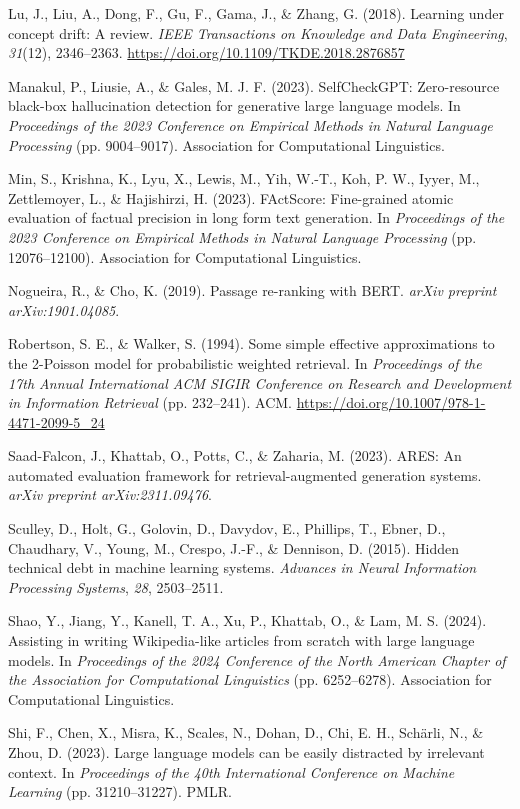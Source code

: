 {Lu, J., Liu, A., Dong, F., Gu, F., Gama, J., \& Zhang, G. (2018). Learning under concept drift: A review. \textit{IEEE Transactions on Knowledge and Data Engineering}, \textit{31}(12), 2346--2363. \url{https://doi.org/10.1109/TKDE.2018.2876857}

Manakul, P., Liusie, A., \& Gales, M. J. F. (2023). SelfCheckGPT: Zero-resource black-box hallucination detection for generative large language models. In \textit{Proceedings of the 2023 Conference on Empirical Methods in Natural Language Processing} (pp. 9004--9017). Association for Computational Linguistics.

Min, S., Krishna, K., Lyu, X., Lewis, M., Yih, W.-T., Koh, P. W., Iyyer, M., Zettlemoyer, L., \& Hajishirzi, H. (2023). FActScore: Fine-grained atomic evaluation of factual precision in long form text generation. In \textit{Proceedings of the 2023 Conference on Empirical Methods in Natural Language Processing} (pp. 12076--12100). Association for Computational Linguistics.

Nogueira, R., \& Cho, K. (2019). Passage re-ranking with BERT. \textit{arXiv preprint arXiv:1901.04085}.

Robertson, S. E., \& Walker, S. (1994). Some simple effective approximations to the 2-Poisson model for probabilistic weighted retrieval. In \textit{Proceedings of the 17th Annual International ACM SIGIR Conference on Research and Development in Information Retrieval} (pp. 232--241). ACM. \url{https://doi.org/10.1007/978-1-4471-2099-5_24}

Saad-Falcon, J., Khattab, O., Potts, C., \& Zaharia, M. (2023). ARES: An automated evaluation framework for retrieval-augmented generation systems. \textit{arXiv preprint arXiv:2311.09476}.

Sculley, D., Holt, G., Golovin, D., Davydov, E., Phillips, T., Ebner, D., Chaudhary, V., Young, M., Crespo, J.-F., \& Dennison, D. (2015). Hidden technical debt in machine learning systems. \textit{Advances in Neural Information Processing Systems}, \textit{28}, 2503--2511.

Shao, Y., Jiang, Y., Kanell, T. A., Xu, P., Khattab, O., \& Lam, M. S. (2024). Assisting in writing Wikipedia-like articles from scratch with large language models. In \textit{Proceedings of the 2024 Conference of the North American Chapter of the Association for Computational Linguistics} (pp. 6252--6278). Association for Computational Linguistics.

Shi, F., Chen, X., Misra, K., Scales, N., Dohan, D., Chi, E. H., Sch\"{a}rli, N., \& Zhou, D. (2023). Large language models can be easily distracted by irrelevant context. In \textit{Proceedings of the 40th International Conference on Machine Learning} (pp. 31210--31227). PMLR.

}
